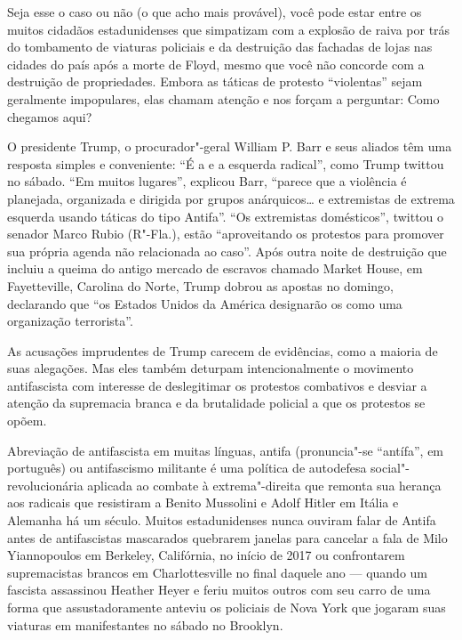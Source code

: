 Seja esse o caso ou não (o que acho mais provável), você pode estar entre os muitos cidadãos estadunidenses que simpatizam com a explosão de raiva por trás do tombamento de viaturas policiais e da destruição das fachadas de lojas nas cidades do país após a morte de Floyd, mesmo que você não concorde com a destruição de propriedades. Embora as táticas de protesto ``violentas'' sejam geralmente impopulares, elas chamam atenção e nos forçam a perguntar: Como chegamos aqui?

O presidente Trump, o procurador"-geral William P. Barr e seus aliados têm uma resposta simples e conveniente: ``É a  e a esquerda radical'', como Trump twittou no sábado. ``Em muitos lugares'', explicou Barr, ``parece que a violência é planejada, organizada e dirigida por grupos anárquicos\ldots{} e extremistas de extrema esquerda usando táticas do tipo Antifa''. ``Os extremistas domésticos'', twittou o senador Marco Rubio (R"-Fla.), estão ``aproveitando os protestos para promover sua própria agenda não relacionada ao caso''. Após outra noite de destruição que incluiu a queima do antigo mercado de escravos chamado Market House, em Fayetteville, Carolina do Norte, Trump dobrou as apostas no domingo, declarando que ``os Estados Unidos da América designarão os  como uma organização terrorista''.
 
As acusações imprudentes de Trump carecem de evidências, como a maioria de suas alegações. Mas eles também deturpam intencionalmente o movimento antifascista com interesse de deslegitimar os protestos combativos e desviar a atenção da supremacia branca e da brutalidade policial a que os protestos se opõem.
 
Abreviação de antifascista em muitas línguas, antifa (pronuncia"-se ``antífa'', em português) ou antifascismo militante é uma política de autodefesa social"-revolucionária aplicada ao combate à extrema"-direita que remonta sua herança aos radicais que resistiram a Benito Mussolini e Adolf Hitler em Itália e Alemanha há um século. Muitos estadunidenses nunca ouviram falar de Antifa antes de antifascistas mascarados quebrarem janelas para cancelar a fala de Milo Yiannopoulos em Berkeley, Califórnia, no início de 2017 ou confrontarem supremacistas brancos em Charlottesville no final daquele ano — quando um fascista assassinou Heather Heyer e feriu muitos outros com seu carro de uma forma que assustadoramente anteviu os policiais de Nova York que jogaram suas viaturas em manifestantes no sábado no Brooklyn.

